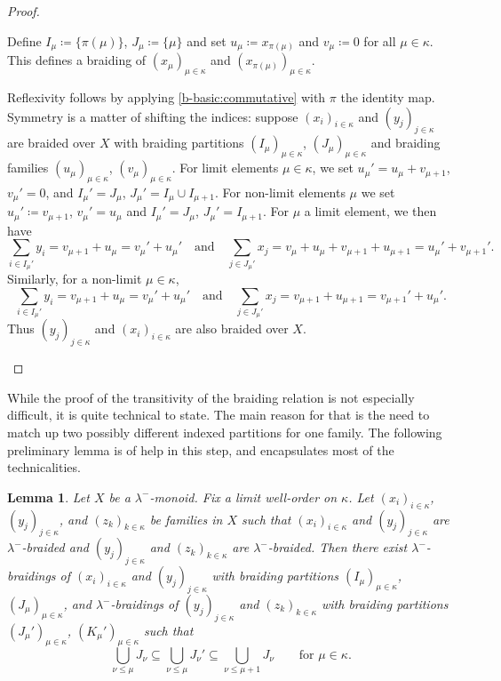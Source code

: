 \documentclass[a4paper,11pt,oneside]{amsart}
\newtheorem{lemma}[teor]{Lemma}
\theoremstyle{remark}
\begin{document}
\begin{proof}
  \begin{proofenumerate}
  \item[\ref{b-basic:commutative}]
  Define $I_\mu \coloneqq \{\pi(\mu)\}$, $J_\mu \coloneqq \{\mu\}$ and set $u_\mu \coloneqq x_{\pi(\mu)}$ and $v_\mu\coloneqq 0$ for all $\mu \in \kappa$.
  This defines a braiding of $(x_\mu)_{\mu \in \kappa}$ and $(x_{\pi(\mu)})_{\mu \in \kappa}$.

  \item[\ref{b-basic:refsym}]
  Reflexivity follows by applying \ref{b-basic:commutative} with $\pi$ the identity map.
  Symmetry is a matter of shifting the indices: suppose $(x_i)_{i \in \kappa}$ and $(y_j)_{j \in \kappa}$ are braided over $X$ with braiding partitions $(I_\mu)_{\mu \in \kappa}$, $(J_\mu)_{\mu \in \kappa}$ and braiding families $(u_\mu)_{\mu \in \kappa}$, $(v_\mu)_{\mu \in \kappa}$.
  For limit elements $\mu \in \kappa$, we set $u_\mu' = u_\mu + v_{\mu+1}$, $v_\mu'=0$, and $I_\mu' = J_\mu$, $J_\mu'=I_\mu \cup I_{\mu+1}$.
  For non-limit elements $\mu$ we set $u_{\mu}'\coloneqq v_{\mu+1}$, $v_\mu'=u_\mu$ and $I_\mu'=J_\mu$, $J_\mu'=I_{\mu+1}$.
  For $\mu$ a limit element, we then have
  \[
    \sum_{i \in I_\mu'} y_i = v_{\mu+1}+u_\mu= v_\mu' + u_\mu' \quad\text{and}\quad \sum_{j \in J_\mu'} x_j = v_{\mu} + u_\mu + v_{\mu+1} + u_{\mu+1} = u_\mu' + v_{\mu+1}'.
  \]
  Similarly, for a non-limit $\mu \in \kappa$,
  \[
    \sum_{i \in I_\mu'} y_i = v_{\mu+1} + u_{\mu} = v_\mu' + u_\mu' \quad\text{and}\quad \sum_{j \in J_\mu'} x_j = v_{\mu+1} + u_{\mu+1} = v_{\mu+1}' + u_\mu'.
  \]
  Thus $(y_j)_{j \in \kappa}$ and $(x_i)_{i \in \kappa}$ are also braided over $X$. \qedhere
  \end{proofenumerate}
\end{proof}

While the proof of the transitivity of the braiding relation is not especially difficult, it is quite technical to state.
The main reason for that is the need to match up two possibly different indexed partitions for one family.
The following preliminary lemma is of help in this step, and encapsulates most of the technicalities.

\begin{lemma} \label{l:braid-repartition}
  Let $X$ be a $\lambda^-$-monoid.
  Fix a limit well-order on $\kappa$.
  Let $(x_i)_{i \in \kappa}$, $(y_j)_{j \in \kappa}$, and $(z_k)_{k \in \kappa}$ be families in $X$ such that $(x_i)_{i \in \kappa}$ and $(y_j)_{j \in \kappa}$ are $\lambda^-$-braided and $(y_j)_{j \in \kappa}$ and $(z_k)_{k \in \kappa}$ are $\lambda^-$-braided.
  Then there exist $\lambda^-$-braidings of $(x_i)_{i \in \kappa}$ and $(y_j)_{j \in \kappa}$ with braiding partitions $(I_\mu)_{\mu \in \kappa}$, $(J_\mu)_{\mu \in \kappa}$, and $\lambda^-$-braidings of  $(y_j)_{j \in \kappa}$ and $(z_k)_{k \in \kappa}$ with braiding partitions $(J_\mu')_{\mu \in \kappa}$, $(K_\mu')_{\mu \in \kappa}$ such that
  \[
    \bigcup_{\nu \le \mu} J_\nu \subseteq \bigcup_{\nu \le \mu} J_\nu' \subseteq \bigcup_{\nu \le \mu+1} J_{\nu} \qquad\text{for } \mu \in \kappa.
  \]
\end{lemma}
\end{document}
